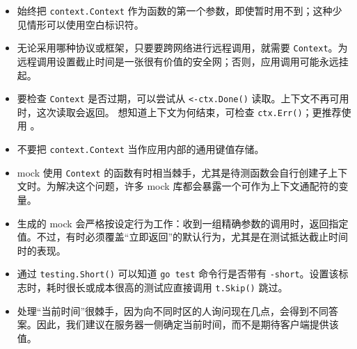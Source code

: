 \begin{itemize}
  \item 始终把 \texttt{context.Context} 作为函数的第一个参数，即使暂时用不到；这种少见情形可以使用空白标识符。
  \item 无论采用哪种协议或框架，只要要跨网络进行远程调用，就需要 \texttt{Context}。为远程调用设置截止时间是一张很有价值的安全网；否则，应用调用可能永远挂起。
  \item 要检查 \texttt{Context} 是否过期，可以尝试从
  \texttt{<-ctx.Done()} 读取。上下文不再可用时，这次读取会返回。
  想知道上下文为何结束，可检查 \texttt{ctx.Err()}；更推荐使用
  。
  \item 不要把 \texttt{context.Context} 当作应用内部的通用键值存储。
  \item mock 使用 \texttt{Context} 的函数有时相当棘手，尤其是待测函数会自行创建子上下文时。为解决这个问题，许多 mock 库都会暴露一个可作为上下文通配符的变量。
  \item 生成的 mock 会严格按设定行为工作：收到一组精确参数的调用时，返回指定值。不过，有时必须覆盖“立即返回”的默认行为，尤其是在测试抵达截止时间时的表现。
  \item 通过 \texttt{testing.Short()} 可以知道 \texttt{go test} 命令行是否带有 \texttt{-short}。设置该标志时，耗时很长或成本很高的测试应直接调用 \texttt{t.Skip()} 跳过。
  \item 处理“当前时间”很棘手，因为向不同时区的人询问现在几点，会得到不同答案。因此，我们建议在服务器一侧确定当前时间，而不是期待客户端提供该值。
\end{itemize}
